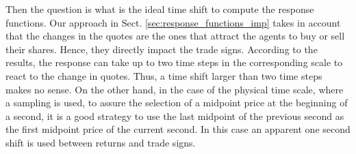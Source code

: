 Then the question is what is the ideal time shift to compute the response
functions. Our approach in Sect. \ref{sec:response_functions_imp} takes in account
that the changes in the quotes are the ones that attract the agents to buy or
sell their shares. Hence, they directly impact the trade signs. According to
the results, the response can take up to two time steps in the corresponding
scale to react to the change in quotes. Thus, a time shift larger than two time
steps makes no sense.
On the other hand, in the case of the physical time scale, where a sampling is
used, to assure the selection of a midpoint price at the beginning of a second,
it is a good strategy to use the last midpoint of the previous second as the
first midpoint price of the current second. In this case an apparent one second
shift is used between returns and trade signs.